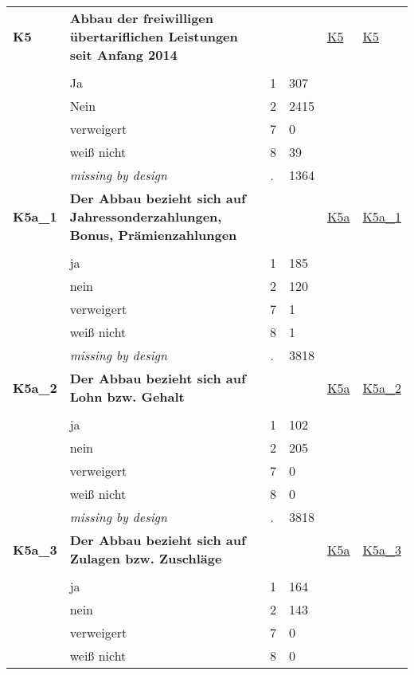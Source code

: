 \begin{longtable}{| L{2.45cm} | L{6cm} | C{1.5cm} | R{1cm} | C{2.25cm} | C{2.25cm} |}
   \midrule
\textbf{K5}\label{var:K5} & \textbf{Abbau der freiwilligen übertariflichen Leistungen seit Anfang 2014} &  &  & \hyperref[K5]{K5} & \hyperref[var:suf:K5]{K5} \\ 
   &  &  &  &  &  \\ 
   & Ja & 1 & 307 &  &  \\ 
   & Nein & 2 & 2415 &  &  \\ 
   & verweigert & 7 & 0 &  &  \\ 
   & weiß nicht & 8 & 39 &  &  \\ 
   & \textit{missing by design} & \textit{.} & 1364 &  &  \\ 
   \midrule
\textbf{K5a\_1}\label{var:K5a:1} & \textbf{Der Abbau bezieht sich auf Jahressonderzahlungen, Bonus, Prämienzahlungen} &  &  & \hyperref[K5a]{K5a} & \hyperref[var:suf:K5a:1]{K5a\_1} \\ 
   &  &  &  &  &  \\ 
   & ja & 1 & 185 &  &  \\ 
   & nein & 2 & 120 &  &  \\ 
   & verweigert & 7 & 1 &  &  \\ 
   & weiß nicht & 8 & 1 &  &  \\ 
   & \textit{missing by design} & \textit{.} & 3818 &  &  \\ 
   \midrule
\textbf{K5a\_2}\label{var:K5a:2} & \textbf{Der Abbau bezieht sich auf Lohn  bzw. Gehalt} &  &  & \hyperref[K5a]{K5a} & \hyperref[var:suf:K5a:2]{K5a\_2} \\ 
   &  &  &  &  &  \\ 
   & ja & 1 & 102 &  &  \\ 
   & nein & 2 & 205 &  &  \\ 
   & verweigert & 7 & 0 &  &  \\ 
   & weiß nicht & 8 & 0 &  &  \\ 
   & \textit{missing by design} & \textit{.} & 3818 &  &  \\ 
   \midrule
\textbf{K5a\_3}\label{var:K5a:3} & \textbf{Der Abbau bezieht sich auf Zulagen bzw. Zuschläge} &  &  & \hyperref[K5a]{K5a} & \hyperref[var:suf:K5a:3]{K5a\_3} \\ 
   &  &  &  &  &  \\ 
   & ja & 1 & 164 &  &  \\ 
   & nein & 2 & 143 &  &  \\ 
   & verweigert & 7 & 0 &  &  \\ 
   & weiß nicht & 8 & 0 &  &  \\ 

\end{longtable}
